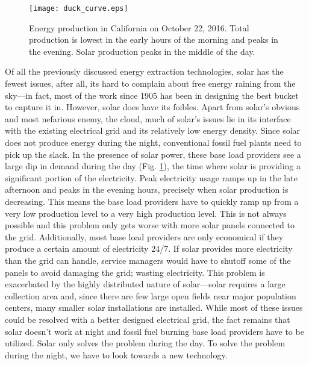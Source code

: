 \begin{figure}[ht]
    \centering
    \texttt{[image: duck\_curve.eps]}
    \caption{Energy production in California on October 22, 2016.\cite{caiso} Total production is lowest in the early hours of the morning and peaks in the evening. Solar production peaks in the middle of the day.}
    \label{fig:duck_curve}
\end{figure}
Of all the previously discussed energy extraction technologies, solar has the fewest issues, after all, its hard to complain about free energy raining from the sky---in fact, most of the work since 1905 has been in designing the best bucket to capture it in. However, solar does have its foibles. Apart from solar's obvious and most nefarious enemy, the cloud, much of solar's issues lie in its interface with the existing electrical grid and its relatively low energy density. Since solar does not produce energy during the night, conventional fossil fuel plants need to pick up the slack. In the presence of solar power, these base load providers see a large dip in demand during the day (Fig. \ref{fig:duck_curve}), the time where solar is providing a significant portion of the electricity. Peak electricity usage ramps up in the late afternoon and peaks in the evening hours, precisely when solar production is decreasing. This means the base load providers have to quickly ramp up from a very low production level to a very high production level. This is not always possible and this problem only gets worse with more solar panels connected to the grid. Additionally, most base load providers are only economical if they produce a certain amount of electricity 24/7. If solar provides more electricity than the grid can handle, service managers would have to shutoff some of the panels to avoid damaging the grid; wasting electricity. This problem is exacerbated by the highly distributed nature of solar---solar requires a large collection area and, since there are few large open fields near major population centers, many smaller solar installations are installed. While most of these issues could be resolved with a better designed electrical grid, the fact remains that solar doesn't work at night and fossil fuel burning base load providers have to be utilized. Solar only solves the problem during the day. To solve the problem during the night, we have to look towards a new technology. 

